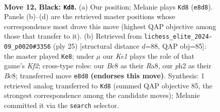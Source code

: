 \documentclass[11pt]{article}
\begin{document}
\clearpage

\begin{figure}[p]\centering
\begin{subfigure}{0.46\textwidth}\centering
\resizebox{\linewidth}{!}{%
\newchessgame
\chessboard[
  setfen={r1b1kb1r/pp3p1p/2n2N2/4p3/3p4/3P4/PqPQ1PPP/2R1K1NR b Kkq - 0 12},
  showmover=false,
  pgfstyle=straightmove, color=movearrow, markmove={e8-d8}
]}
\caption{}
\end{subfigure}\hfill
\begin{subfigure}{0.46\textwidth}\centering
\resizebox{\linewidth}{!}{%
\newchessgame
\chessboard[
  setfen={r1b4r/pp2pkbp/2n3p1/q1p3N1/5p2/1PP5/P1PQ1PPP/R3R1K1 b - - 1 13},
  showmover=false,
  pgfstyle=straightmove, color=movearrow, markmove={f7-e8}
]}
\caption{}
\end{subfigure}
\\[4pt]

\caption{\textbf{Move 12, Black: \texttt{Kd8}.} (a) Our position; Melanie plays \texttt{Kd8} (\texttt{e8d8}). Panels (b)--(d) are the retrieved master positions whose correspondence most drove this move (highest QAP objective among those that transfer to it). (b) Retrieved from \texttt{lichess\_elite\_2024-09\_p0020\#3356} (ply 25) [structural distance $d$=88, QAP obj=85]: the master played \texttt{Ke8}; under $\mu$ our \emph{Ke1} plays the role of that game's \emph{Kf2}; cross-type roles: our \emph{B}c8 as their \emph{R}a8, our \emph{p}h2 as their \emph{B}c8; transferred move \texttt{e8d8} \textbf{(endorses this move)}. Synthesis: 1 retrieved analog transferred to \texttt{Kd8} (summed QAP objective 85, the strongest correspondence among the candidate moves); Melanie committed it via the \texttt{search} selector.}
\label{fig:thought-m23}
\end{figure}

\clearpage
\end{document}
